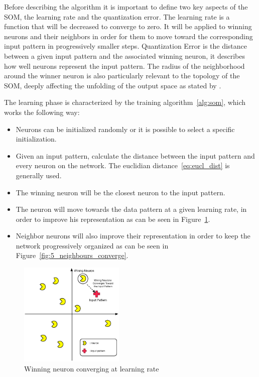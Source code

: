 Before describing the algorithm it is important to define two key aspects of the SOM, the learning rate and the quantization error. The learning rate is a function that will be decreased to converge to zero. It will be applied to winning neurons and their neighbors in order for them to move toward the corresponding input pattern in progressively smaller steps. Quantization Error is the distance between a given input pattern and the associated winning neuron, it describes how well neurons represent the input pattern. The radius of the neighborhood around the winner neuron is also particularly relevant to the topology of the SOM, deeply affecting the unfolding of the output space as stated by \citep{Bacao2005}.
\par




The learning phase is characterized by the training algorithm~\ref{alg:som}, which works the following way:
\begin{itemize}
  \item Neurons can be initialized randomly or it is possible to select a specific initialization.
  \item Given an input pattern, calculate the distance between the input pattern and every neuron on the network. The euclidian distance~\ref{eq:eucl_dist} is generally used.
  \item The winning neuron will be the closest neuron to the input pattern.
  \item The neuron will move towards the data pattern at a given learning rate, in order to improve his representation as can be seen in Figure~\ref{fig:4_wining_neuron_converge}.
  \item Neighbor neurons will also improve their representation in order to keep the network progressively organized as can be seen in Figure~\ref{fig:5_neighbours_converge}.
\end{itemize}



\begin{figure}
  \begin{center}
    \includegraphics[width=5cm]{images/4_wining_neuron_converge.eps}
  \end{center}
  \caption{ Winning neuron converging at learning rate }
  \label{fig:4_wining_neuron_converge}
\end{figure}

